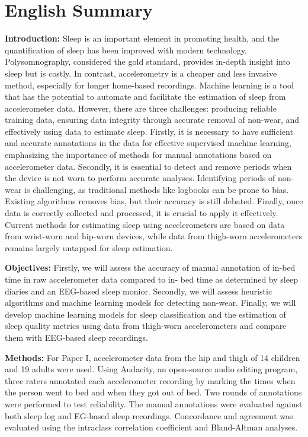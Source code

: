 \documentclass[
  10pt,
]{scrbook}
\let\originaltextbf\textbf
\renewcommand{\textbf}[1]{\textcolor{color1}{\textsf{\originaltextbf{#1}}}}
\begin{document}
\hypertarget{english-summary}{%
\chapter{English Summary}\label{english-summary}}

\textbf{Introduction:} Sleep is an important element in promoting
health, and the quantification of sleep has been improved with modern
technology. Polysomnography, considered the gold standard, provides
in-depth insight into sleep but is costly. In contrast, accelerometry is
a cheaper and less invasive method, especially for longer home-based
recordings. Machine learning is a tool that has the potential to
automate and facilitate the estimation of sleep from accelerometer data.
However, there are three challenges: producing reliable training data,
ensuring data integrity through accurate removal of non-wear, and
effectively using data to estimate sleep. Firstly, it is necessary to
have sufficient and accurate annotations in the data for effective
supervised machine learning, emphasizing the importance of methods for
manual annotations based on accelerometer data. Secondly, it is
essential to detect and remove periods when the device is not worn to
perform accurate analyses. Identifying periods of non-wear is
challenging, as traditional methods like logbooks can be prone to bias.
Existing algorithms removes bias, but their accuracy is still debated.
Finally, once data is correctly collected and processed, it is crucial
to apply it effectively. Current methods for estimating sleep using
accelerometers are based on data from wrist-worn and hip-worn devices,
while data from thigh-worn accelerometers remains largely untapped for
sleep estimation.

\textbf{Objectives:} Firstly, we will assess the accuracy of manual
annotation of in-bed time in raw accelerometer data compared to in- bed
time as determined by sleep diaries and an EEG-based sleep monior.
Secondly, we will assess heuristic algorithms and machine learning
models for detecting non-wear. Finally, we will develop machine learning
models for sleep classification and the estimation of sleep quality
metrics using data from thigh-worn accelerometers and compare them with
EEG-based sleep recordings.

\textbf{Methods:} For Paper I, accelerometer data from the hip and thigh
of 14 children and 19 adults were used. Using Audacity, an open-source
audio editing program, three raters annotated each accelerometer
recording by marking the times when the person went to bed and when they
got out of bed. Two rounds of annotations were performed to test
reliability. The manual annotations were evaluated against both sleep
log and EG-based sleep recordings. Concordance and agreement was
evaluated using the intraclass correlation coefficient and Bland-Altman
analyses.
\end{document}

